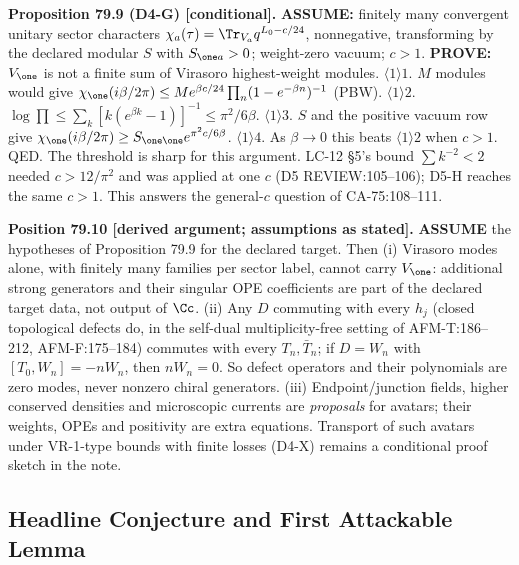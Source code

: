 \textbf{Proposition 79.9 (D4-G) [conditional].}  \textbf{ASSUME:} finitely many convergent unitary
sector characters \(\chi_a(\tau)=\Tr_{V_a}q^{L_0-c/24}\), nonnegative, transforming by the declared
modular \(S\) with \(S_{\one a}>0\); weight-zero vacuum; \(c>1\).  \textbf{PROVE:} \(V_\one\) is not
a finite sum of Virasoro highest-weight modules.
\(\langle1\rangle1\). \(M\) modules would give \(\chi_\one(i\beta/2\pi)\le Me^{\beta c/24}\prod_n(1-e^{-\beta n})^{-1}\) (PBW).
\(\langle1\rangle2\). \(\log\prod\le\sum_k[k(e^{\beta k}-1)]^{-1}\le\pi^2/6\beta\).
\(\langle1\rangle3\). \(S\) and the positive vacuum row give \(\chi_\one(i\beta/2\pi)\ge S_{\one\one}e^{\pi^2c/6\beta}\).
\(\langle1\rangle4\). As \(\beta\to0\) this beats \(\langle1\rangle2\) when \(c>1\).  QED.
The threshold is sharp for this argument.  LC-12 \S5's bound \(\sum k^{-2}<2\) needed
\(c>12/\pi^2\) and was applied at one \(c\) (D5 REVIEW:105--106); D5-H reaches the same \(c>1\).
This answers the general-\(c\) question of CA-75:108--111.

\textbf{Position 79.10 [derived argument; assumptions as stated].}  \textbf{ASSUME} the
hypotheses of Proposition 79.9 for the declared target.  Then (i) Virasoro modes alone, with
finitely many families per sector label, cannot carry \(V_\one\): additional strong generators
and their singular OPE coefficients are part of the declared target data, not output of
\(\Cc\).  (ii) Any \(D\) commuting with every \(h_j\) (closed topological defects do, in the
self-dual multiplicity-free setting of AFM-T:186--212, AFM-F:175--184) commutes with every
\(T_n,\bar T_n\); if \(D=W_n\) with \([T_0,W_n]=-nW_n\), then \(nW_n=0\).  So defect operators
and their polynomials are zero modes, never nonzero chiral generators.  (iii) Endpoint/junction
fields, higher conserved densities and microscopic currents are \emph{proposals} for avatars;
their weights, OPEs and positivity are extra equations.  Transport of such avatars under
VR-1-type bounds with finite losses (D4-X) remains a conditional proof sketch in the note.

\subsection{Headline Conjecture and First Attackable Lemma}
\label{sec:ks-shell-conjecture}

